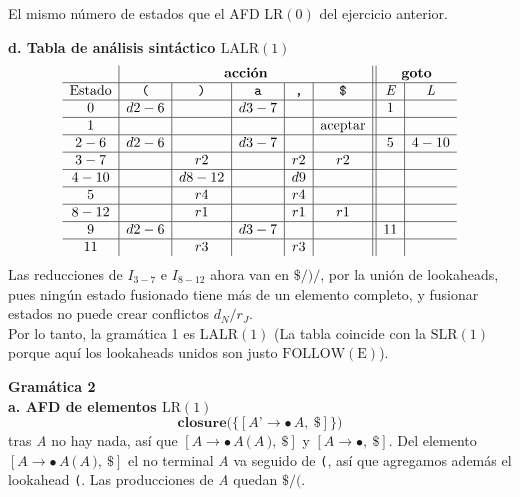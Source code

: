 \documentclass[12pt,letterpaper]{article}
\newcommand{\nt}[1]{\textit{#1}}
\newcommand{\tk}[1]{\texttt{#1}}
\newcommand{\tx}[1]{\text{#1}}
\newcommand{\Follow}[1]{\mathrm{FOLLOW}(#1)}
\newcommand{\lr}{\mathrm{LR(1)}}
\newcommand{\lrc}{\mathrm{LR(0)}}
\newcommand{\slr}{\mathrm{SLR(1)}}
\newcommand{\lalr}{\mathrm{LALR(1)}}
\begin{document}
\begin{enumerate}[label=\arabic*.]
  El mismo número de estados que el AFD $\lrc$ del ejercicio anterior.

  \bigskip

  \textbf{\large d. Tabla de análisis sintáctico $\lalr$}\\
  \[
  \begin{array}{c|c|c|c|c|c||c|c}
    & \multicolumn{5}{c||}{\textbf{acción}} & \multicolumn{2}{c}{\textbf{goto}} \\ \hline
    \text{Estado} & \tk{(} & \tk{)} & \tk{a} & \tk{,} & \tk{\$} & \nt{E} & \nt{L} \\ \hline
    0   & d2-6 &      & d3-7 &     &    & 1 &     \\ \hline
    1   &     &      &     &     & \text{aceptar} &   &     \\ \hline
    2-6  & d2-6 &      & d3-7 &     &    & 5 & 4-10 \\ \hline
    3-7  &     & r2   &     & r2  & r2 &   &     \\ \hline
    4-10 &     & d8-12 &     & d9  &    &   &     \\ \hline
    5   &     & r4   &     & r4  &    &   &     \\ \hline
    8-12 &     & r1   &     & r1  & r1 &   &     \\ \hline
    9   & d2-6 &      & d3-7 &     &    & 11 &    \\ \hline
    11  &     & r3   &     & r3  &    &   &     \\
  \end{array}
  \]
  Las reducciones de $I_{3-7}$ e $I_{8-12}$ ahora van en $\tk{\$}/\tk{)}/\tk{,}$ por la unión de lookaheads, pues
  ningún estado fusionado tiene más de un elemento completo, y fusionar estados no puede crear conflictos
  $d_N/r_J$.\\

  Por lo tanto, la gramática 1 es $\lalr$
  (La tabla coincide con la $\slr$ porque aquí los lookaheads unidos son justo $\Follow{\tx{E}}$).
  

  \newpage

  
  \textbf{\Large Gramática 2}\\

  \textbf{\large a. AFD de elementos $\lr$}\\

  \[
  \textbf{closure}\big(\{[\nt{A'}\to\bullet\,\nt{A},\ \tk{\$}]\}\big)
  \]
  tras \nt{A} no hay nada, así que
  $[\nt{A}\to\bullet\,\nt{A}\,\tk{(}\,\nt{A}\,\tk{)},\ \tk{\$}]$ y $[\nt{A}\to\bullet,\ \tk{\$}]$.
  Del elemento $[\nt{A}\to\bullet\,\nt{A}\,\tk{(}\,\nt{A}\,\tk{)},\ \tk{\$}]$ el no terminal \nt{A} va seguido
  de \tk{(}, así que agregamos además el lookahead \tk{(}. Las producciones de \nt{A} quedan $\tk{\$}/\tk{(}$.


\end{enumerate}
\end{document}
